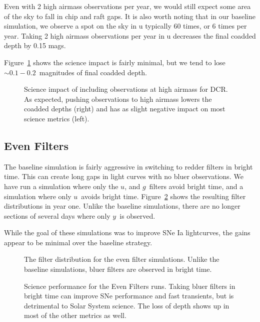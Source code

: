 Even with 2 high airmass observations per year, we would still expect some area of the sky to fall in chip and raft gaps.  It is also worth noting that in our baseline simulation, we observe a spot on the sky in u typically 60 times, or 6 times per year. Taking 2 high airmass observations per year in u decreases the final coadded depth by 0.15 mags.

Figure~\ref{fig:dcr_radar} shows the science impact is fairly minimal, but we tend to lose $\sim0.1-0.2$\ magnitudes of final coadded depth.

\begin{figure}
\caption{Science impact of including observations at high airmass for DCR. As expected, pushing observations to high airmass lowers the coadded depths (right) and has as slight negative impact on most science metrics (left).}\label{fig:dcr_radar}
\end{figure}


\subsection{Even Filters}

The baseline simulation is fairly aggressive in switching to redder filters in bright time. This can create long gaps in light curves with no bluer observations. We have run a simulation where only the $u$, and $g$\ filters avoid bright time, and a simulation where only $u$\ avoids bright time. Figure~\ref{fig:even_filt_hourglass} shows the resulting filter distributions in year one. Unlike the baseline simulations, there are no longer sections of several days where only $y$\ is observed.

While the goal of these simulations was to improve SNe Ia lightcurves, the gains appear to be minimal over the baseline strategy.


\begin{figure}
\label{fig:even_filt_hourglass}
\caption{The filter distribution for the even filter simulations. Unlike the baseline simulations, bluer filters are observed in bright time.}
\end{figure}



\begin{figure}
\caption{Science performance for the Even Filters runs.  Taking bluer filters in bright time can improve SNe performance and fast transients, but is detrimental to Solar System science.  The loss of depth shows up in most of the other metrics as well.}\label{fig:even_filt_radar}
\end{figure}


